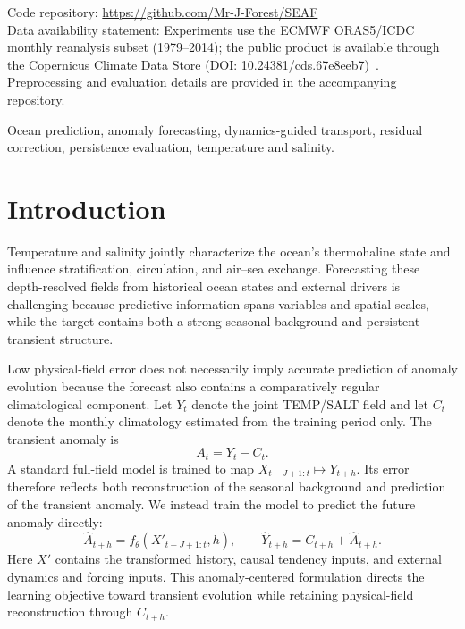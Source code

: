 \documentclass[conference]{IEEEtran}
\begin{document}
\renewcommand{\UrlFont}{\small\tt}
Code repository: \url{https://github.com/Mr-J-Forest/SEAF}\\
Data availability statement: Experiments use the ECMWF ORAS5/ICDC monthly reanalysis subset (1979--2014); the public product is available through the Copernicus Climate Data Store (DOI: 10.24381/cds.67e8eeb7)~\cite{copernicus2021oras5}. Preprocessing and evaluation details are provided in the accompanying repository.

\begin{IEEEkeywords}
Ocean prediction, anomaly forecasting, dynamics-guided transport, residual correction, persistence evaluation, temperature and salinity.
\end{IEEEkeywords}

\section{Introduction}

Temperature and salinity jointly characterize the ocean's thermohaline state and influence stratification, circulation, and air--sea exchange. Forecasting these depth-resolved fields from historical ocean states and external drivers is challenging because predictive information spans variables and spatial scales, while the target contains both a strong seasonal background and persistent transient structure.

Low physical-field error does not necessarily imply accurate prediction of anomaly evolution because the forecast also contains a comparatively regular climatological component. Let $Y_t$ denote the joint TEMP/SALT field and let $C_t$ denote the monthly climatology estimated from the training period only. The transient anomaly is
\begin{equation}
A_t=Y_t-C_t.
\label{eq:intro_anomaly}
\end{equation}
A standard full-field model is trained to map $X_{t-J+1:t}\mapsto Y_{t+h}$. Its error therefore reflects both reconstruction of the seasonal background and prediction of the transient anomaly. We instead train the model to predict the future anomaly directly:
\begin{equation}
\widehat{A}_{t+h}=f_{\theta}(X'_{t-J+1:t},h),\qquad
\widehat{Y}_{t+h}=C_{t+h}+\widehat{A}_{t+h}.
\label{eq:intro_direct}
\end{equation}
Here $X'$ contains the transformed history, causal tendency inputs, and external dynamics and forcing inputs. This anomaly-centered formulation directs the learning objective toward transient evolution while retaining physical-field reconstruction through $C_{t+h}$.
\end{document}
